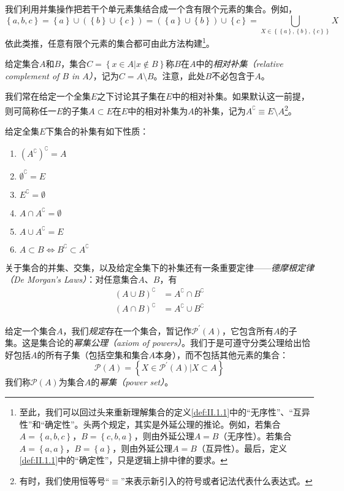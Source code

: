 \documentclass[../main.tex]{subfiles}
\begin{document}
我们利用并集操作把若干个单元素集结合成一个含有限个元素的集合。例如，
\[
    \left\{a,b,c\right\}=\left\{a\right\}\cup\left(\left\{b\right\}\cup\left\{c\right\}\right)=\left(\left\{a\right\}\cup\left\{b\right\}\right)\cup\left\{c\right\}=\bigcup_{X\in\left\{\left\{a\right\},\left\{b\right\},\left\{c\right\}\right\}}X
\]
依此类推，任意有限个元素的集合都可由此方法构建\footnote{至此，我们可以回过头来重新理解集合的定义\ref{def:II.1.1}中的“无序性”、“互异性”和“确定性”。头两个规定，其实是外延公理的推论。例如，若集合$A=\left\{a,b,c\right\}$，$B=\left\{c,b,a\right\}$，则由外延公理$A=B$（无序性）。若集合$A=\left\{a,a\right\}$，$B=\left\{a\right\}$，则由外延公理$A=B$（互异性）。最后，定义\ref{def:II.1.1}中的“确定性”，只是逻辑上排中律的要求。}。

给定集合$A$和$B$，集合$C=\left\{x\in A|x\notin B\right\}$称$B$在$A$中的\emph{相对补集（relative complement of $B$ in $A$）}，记为$C=A\setminus B$。注意，此处$B$不必包含于$A$。

我们常在给定一个全集$E$之下讨论其子集在$E$中的相对补集。如果默认这一前提，则可简称任一$E$的子集$A\subset E$在$E$中的相对补集为$A$的补集，记为$A^\complement\equiv E\setminus A$\footnote{有时，我们使用恒等号“$\equiv$”来表示新引入的符号或者记法代表什么表达式。}。

给定全集$E$下集合的补集有如下性质：
\begin{enumerate}
    \item $\left(A^\complement\right)^\complement=A$
    \item $\emptyset^\complement=E$
    \item $E^\complement=\emptyset$
    \item $A\cap A^\complement=\emptyset$
    \item $A\cup A^\complement=E$
    \item $A\subset B\Leftrightarrow B^\complement\subset A^\complement$
\end{enumerate}

关于集合的并集、交集，以及给定全集下的补集还有一条重要定律——\emph{德摩根定律（De Morgan's Laws）}：对任意集合$A$、$B$，有
\begin{align*}
    \left(A\cup B\right)^\complement & =A^\complement\cap B^\complement \\
    \left(A\cap B\right)^\complement & =A^\complement\cup B^\complement
\end{align*}

给定一个集合$A$，我们\emph{规定}存在一个集合，暂记作$\mathcal{P}^\prime\left(A\right)$，它包含所有$A$的子集。这是集合论的\emph{幂集公理（axiom of powers）}。我们于是可遵守分类公理给出恰好包括$A$的所有子集（包括空集和集合$A$本身），而不包括其他元素的集合：
\[
    \mathcal{P}\left(A\right)=\left\{X\in\mathcal{P}^\prime\left(A\right)|X\subset A\right\}
\]
我们称$\mathcal{P}\left(A\right)$为集合$A$的\emph{幂集（power set）}。
\end{document}
